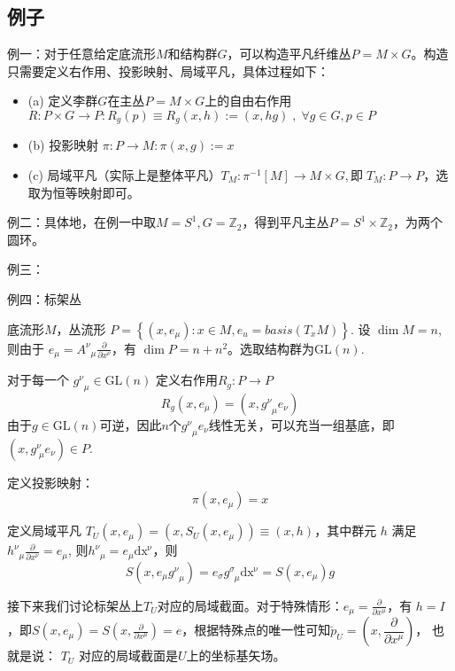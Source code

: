 \documentclass{ctexbook}
\begin{document}
\subsection{例子}

例一：对于任意给定底流形$M$和结构群$G$，可以构造平凡纤维丛$P=M\times G$。构造只需要定义右作用、投影映射、局域平凡，具体过程如下：
\begin{itemize}
    \item (a) 定义李群$G$在主丛$P=M\times G$上的自由右作用$R\colon P\times G\to P: R_{g}(p)\equiv R_g(x,h):=(x,hg)\;,\;\forall g\in G,p\in P$
    \item (b) 投影映射 $\pi\colon P\to M:\pi(x,g):=x$
    \item (c) 局域平凡（实际上是整体平凡）$T_M\colon\pi^{-1}[M]\to M\times G,\text{即}\;T_M\colon P\to P$，选取为恒等映射即可。
\end{itemize}

例二：具体地，在例一中取$M=S^1,G=\mathbb{Z}_2$，得到平凡主丛$P=S^{1}\times\mathbb{Z}_2$，为两个圆环。

例三：

例四：标架丛

底流形$M$，丛流形 $P=\left\{(x,e_{\mu})\colon x\in M,{e_u}=basis{(T_{x}M)}\right\}$. 
设 $\dim{M}=n$, 则由于 $e_{\mu}=A^{\nu}_{\;\;\mu}\frac{\partial}{\partial x^{\nu}}$，有 $\dim{P}=n+n^2$。选取结构群为$\mathrm{GL}(n)$. 

对于每一个 $g^{\nu}_{\;\;\mu}\in\mathrm{GL}(n)$ 定义右作用$R_{g}\colon P\to P$
\begin{equation}
    R_{g}(x,e_\mu)=(x,g^{\nu}_{\;\;\mu}e_{\nu})
\end{equation}
由于$g\in \mathrm{GL}(n)$可逆，因此$n$个$g^{\nu}_{\;\;\mu}e_{\nu}$线性无关，可以充当一组基底，即$(x,g^\nu_{\;\mu} e_\nu)\in P$.

定义投影映射：
\begin{equation}
    \pi(x,e_\mu)=x
\end{equation}

定义局域平凡 $T_{U}(x,e_\mu)=(x,S_U(x,e_\mu))\equiv(x,h)$，其中群元 $h$ 满足 $h^{\nu}_{\;\;\mu}\frac{\partial}{\partial x^{\nu}}=e_\mu$, 则$h^{\nu}_{\;\;\mu}={e_\mu}\mathrm{dx^{\nu}}$，则
\begin{equation}
    S(x,e_\mu g^{\nu}_{\;\;\mu})=e_{\sigma}g^{\sigma}_{\;\;\mu}\mathrm{dx^{\nu}}=S(x,e_\mu)g
\end{equation}

接下来我们讨论标架丛上$T_{U}$对应的局域截面。对于特殊情形：$e_{\mu}=\frac{\partial}{\partial x^{\mu}}$，有 $h=I$，即$S(x,e_{\mu})=S\left(x,\frac{\partial}{\partial x^{\mu}}\right)=e$，根据特殊点的唯一性可知$\breve{p}_{U}=\left(x,\dfrac{\partial}{\partial x^{\mu}}\right)$， 也就是说： $T_U$ 对应的局域截面是$U$上的坐标基矢场。
\end{document}
